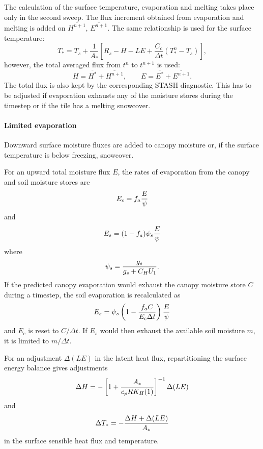 \documentclass{UMDP_article}
\begin{document}
The calculation of the surface temperature, evaporation and melting
takes place only in the second sweep. The flux increment obtained from
evaporation and melting is added on $\overline{H^{n+1}}$,
$\overline{E^{n+1}}$.  The same relationship is used for the surface
temperature:
\begin{equation*}
  T_{*}=T_{s}+\frac{1}{A_{*}}
  \left[R_{s}-H-LE+\frac{C_{c}}{\Delta t}\left(T_{*}^{n}-T_{s}\right)\right],
\end{equation*}
however, the total averaged flux from $t^{n}$ to $t^{n+1}$ is used:
\begin{equation*}
  H=\overline{H^{*}}+\overline{H^{n+1}},\qquad E=\overline{E^{*}}+\overline{E^{n+1}}.
\end{equation*}
The total flux is also kept by the corresponding STASH
diagnostic. This has to be adjusted if evaporation exhausts any of the
moisture stores during the timestep or if the tile has a melting
snowcover.

\paragraph{Limited evaporation}

Downward surface moisture fluxes are added to canopy moisture or, if
the surface temperature is below freezing, snowcover.

For an upward total moisture flux $E$, the rates of evaporation from
the canopy and soil moisture stores are
\begin{equation}
  E_c = f_a{E\over\psi}
\end{equation}
and
\begin{equation}
  E_s = (1 - f_a)\psi_s {E\over\psi}
\end{equation}
where
\begin{equation}
  \psi_s = {g_s\over g_s+C_HU_1}.
\end{equation}
If the predicted canopy evaporation would exhaust the canopy moisture
store $C$ during a timestep, the soil evaporation is recalculated as
\begin{equation}
  E_s =\psi_s\left(1 - {f_aC\over E_c\Delta t}\right){E\over\psi}
\end{equation}
and $E_c$ is reset to $C/\Delta t$. If $E_s$ would then exhaust the
available soil moisture $m$, it is limited to $m/\Delta t$.

For an adjustment $\Delta(LE)$ in the latent heat flux, repartitioning
the surface energy balance gives adjustments
\begin{equation}
  \Delta H = - \left[1 + {A_*\over c_pRK_H(1)}\right]^{-1}\Delta(LE)
\end{equation}
and
\begin{equation}
  \Delta T_* = - {\Delta H+\Delta(LE)\over A_*}
\end{equation}
in the surface sensible heat flux and temperature.
\end{document}
